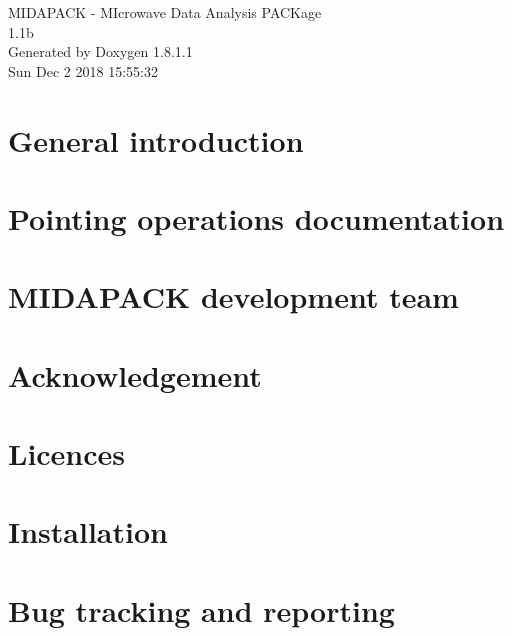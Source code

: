 \documentclass{book}
\begin{document}
\hypersetup{pageanchor=false,citecolor=blue}
\begin{titlepage}
\vspace*{7cm}
\begin{center}
{\Large M\-I\-D\-A\-P\-A\-C\-K -\/ M\-Icrowave Data Analysis P\-A\-C\-Kage \\[1ex]\large 1.\-1b }\\
\vspace*{1cm}
{\large Generated by Doxygen 1.8.1.1}\\
\vspace*{0.5cm}
{\small Sun Dec 2 2018 15:55:32}\\
\end{center}
\end{titlepage}
\clearemptydoublepage
{}
\tableofcontents
\clearemptydoublepage
{}
\hypersetup{pageanchor=true,citecolor=blue}
\chapter{General introduction}
\label{index}\hypertarget{index}{}
\chapter{Pointing operations documentation}
\label{pointing}
\hypertarget{pointing}{}

\chapter{M\-I\-D\-A\-P\-A\-C\-K development team}
\label{sect_team}
\hypertarget{sect_team}{}

\chapter{Acknowledgement}
\label{sect_ackno}
\hypertarget{sect_ackno}{}

\chapter{Licences}
\label{page_license}
\hypertarget{page_license}{}

\chapter{Installation}
\label{page_install}
\hypertarget{page_install}{}

\chapter{Bug tracking and reporting}
\label{sect_bugreporting}
\hypertarget{sect_bugreporting}{}

\end{document}
